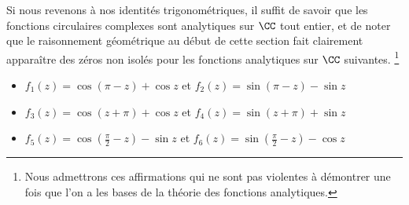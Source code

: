 Si nous revenons à nos identités trigonométriques, il suffit de savoir que les fonctions circulaires complexes sont analytiques sur $\CC$ tout entier, et de noter que le raisonnement géométrique au début de cette section fait clairement apparaître des zéros non isolés pour les fonctions analytiques sur $\CC$ suivantes.%
\footnote{
	Nous admettrons ces affirmations qui ne sont pas violentes à démontrer une fois que l'on a les bases de la théorie des fonctions analytiques.
}
%
\begin{itemize}[label=\small\textbullet]
	\item $f_1(z) = \cos (\pi - z) + \cos z$ 
	   et $f_2(z) = \sin (\pi - z) - \sin z$ 

	\smallskip
	\item $f_3(z) =\cos (z + \pi) + \cos z$ 
	   et $f_4(z) =\sin (z + \pi) + \sin z$

	\smallskip
	\item $f_5(z) =\cos \left( \frac{\pi}{2} - z \right) - \sin z$ 
	   et $f_6(z) =\sin \left( \frac{\pi}{2} - z \right) - \cos z$ 
\end{itemize}








